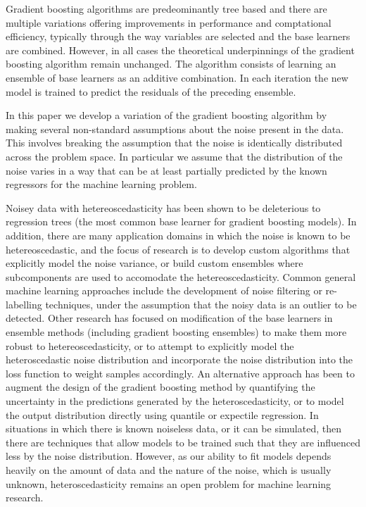 \documentclass[12pt,a4paper]{article}
\begin{document}
Gradient boosting algorithms are predeominantly tree based and there are multiple variations 
offering improvements in performance and comptational efficiency, typically through the way variables
are selected and the base learners are combined\cite{Ke2017}.
However, in all cases the theoretical underpinnings of the gradient boosting algorithm
remain unchanged. The algorithm consists of learning an ensemble of base learners
as an additive combination. In each iteration the new model is trained to predict the
residuals of the preceding ensemble\cite{Friedman2000,Friedman2001,Friedman2002}. 

In this paper we develop a variation of the gradient boosting algorithm by making
several non-standard assumptions about the noise present in the data.
This involves breaking the assumption that the noise is identically distributed across the
problem space. In particular we assume that the distribution of the noise varies in a way that
can be at least partially predicted by the known regressors for the machine learning problem.

Noisey data with hetereoscedasticity has been shown to be deleterious to regression trees (the most
common base learner for gradient boosting models)\cite{ruth2016effect}. In addition, there are
many application domains in which the noise is known to be hetereoscedastic, and the focus of
research is to develop custom algorithms that explicitly model the noise variance\cite{Zhenxing2020,Zhang2023},
or build custom ensembles where subcomponents are used to accomodate the hetereoscedasticity\cite{Zeng2022}. 
Common general machine learning approaches include the development
of noise filtering or re-labelling techniques, under the assumption that the noisy data is an
outlier to be detected\cite{Ustinovskiy2016}. Other research has focused on modification of the base 
learners in ensemble methods (including gradient boosting ensembles) to make them more robust to 
hetereoscedasticity\cite{Henrey2016}, or to attempt to explicitly model the heteroscedastic noise
distribution\cite{Natarajan2009,Thomas2018} and incorporate the noise distribution into the loss function to 
weight samples accordingly\cite{Lee2017}. 
An alternative approach has been to augment the design of the gradient boosting method 
by quantifying the uncertainty in the predictions generated by the heteroscedasticity\cite{brophy2022},
or to model the output distribution directly using quantile or expectile regression\cite{Yang2014}.
In situations in which
there is known noiseless data, or it can be simulated, then there are techniques that allow models to
be trained such that they are influenced less by the noise distribution\cite{Wu2021}. However, as our 
ability to fit models depends heavily on the amount of data and the nature of the noise, which is usually
unknown, heteroscedasticity remains an open problem for machine learning research.
\end{document}
